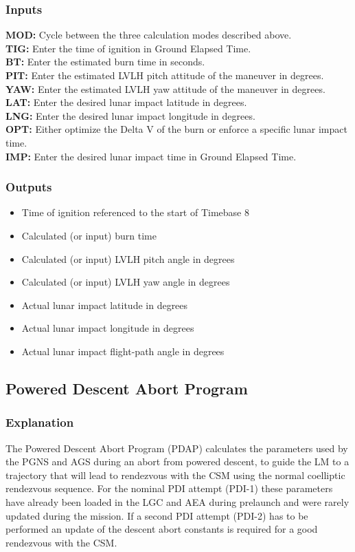 \documentclass[11pt]{article} %
\begin{document}
\subsubsection{Inputs}
\textbf{MOD:} Cycle between the three calculation modes described above.\\
\textbf{TIG:} Enter the time of ignition in Ground Elapsed Time.\\
\textbf{BT:} Enter the estimated burn time in seconds.\\
\textbf{PIT:} Enter the estimated LVLH pitch attitude of the maneuver in degrees.\\
\textbf{YAW:} Enter the estimated LVLH yaw attitude of the maneuver in degrees.\\
\textbf{LAT:} Enter the desired lunar impact latitude in degrees.\\
\textbf{LNG:} Enter the desired lunar impact longitude in degrees.\\
\textbf{OPT:} Either optimize the Delta V of the burn or enforce a specific lunar impact time.\\
\textbf{IMP:} Enter the desired lunar impact time in Ground Elapsed Time.\\

\subsubsection{Outputs}
\begin{itemize}
	\item Time of ignition referenced to the start of Timebase 8
	\item Calculated (or input) burn time
	\item Calculated (or input) LVLH pitch angle in degrees
	\item Calculated (or input) LVLH yaw angle in degrees
	\item Actual lunar impact latitude in degrees
	\item Actual lunar impact longitude in degrees
	\item Actual lunar impact flight-path angle in degrees
\end{itemize}

\newpage
\subsection{Powered Descent Abort Program}
\subsubsection{Explanation}
The Powered Descent Abort Program (PDAP) calculates the parameters used by the PGNS and AGS during an abort from powered descent, to guide the LM to a trajectory that will lead to rendezvous with the CSM using the normal coelliptic rendezvous sequence. For the nominal PDI attempt (PDI-1) these parameters have already been loaded in the LGC and AEA during prelaunch and were rarely updated during the mission. If a second PDI attempt (PDI-2) has to be performed an update of the descent abort constants is required for a good rendezvous with the CSM.\\
\end{document}
